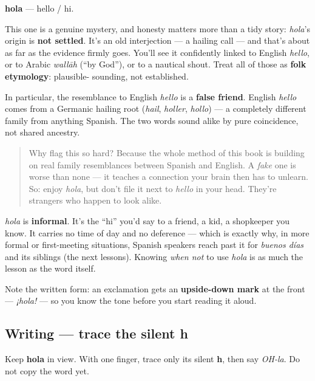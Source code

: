 \begin{cousinweb}
\textbf{hola} — hello / hi.

This one is a genuine mystery, and honesty matters more than a tidy story: \emph{hola}'s origin is \textbf{not settled}. It's an old interjection — a hailing call — and that's about as far as the evidence firmly goes. You'll see it confidently linked to English \emph{hello}, or to Arabic \emph{wallāh} (\textquotedblleft{}by God\textquotedblright{}), or to a nautical shout. Treat all of those as \textbf{folk etymology}: plausible- sounding, not established.

In particular, the resemblance to English \emph{hello} is a \textbf{false friend}. English \emph{hello} comes from a Germanic hailing root (\emph{hail}, \emph{holler}, \emph{hollo}) — a completely different family from anything Spanish. The two words sound alike by pure coincidence, not shared ancestry.

\begin{quote}
Why flag this so hard? Because the whole method of this book is building on real family resemblances between Spanish and English. A \emph{fake} one is worse than none — it teaches a connection your brain then has to unlearn. So: enjoy \emph{hola}, but don't file it next to \emph{hello} in your head. They're strangers who happen to look alike.
\end{quote}
\end{cousinweb}

\begin{culture}
\emph{hola} is \textbf{informal}. It's the \textquotedblleft{}hi\textquotedblright{} you'd say to a friend, a kid, a shopkeeper you know. It carries no time of day and no deference — which is exactly why, in more formal or first-meeting situations, Spanish speakers reach past it for \emph{buenos días} and its siblings (the next lessons). Knowing \emph{when not} to use \emph{hola} is as much the lesson as the word itself.

Note the written form: an exclamation gets an \textbf{upside-down mark} at the front — \emph{¡hola!} — so you know the tone before you start reading it aloud.
\end{culture}

\subsection*{Writing — trace the silent h}
Keep \textbf{hola} in view. With one finger, trace only its silent \textbf{h}, then say \emph{OH-la}. Do not copy the word yet.

